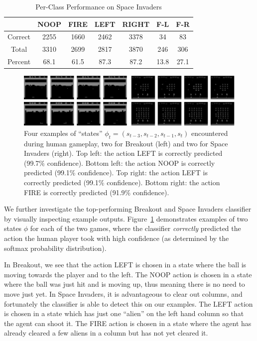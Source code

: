 \documentclass[letterpaper, 10pt, conference]{ieeeconf}
\begin{document}
\begin{table}[!t]
\renewcommand{\arraystretch}{1.3}
\caption{Per-Class Performance on Space Invaders}
\label{tab:spaceinv_perclass}
\centering
\begin{tabular}{c c c c c c c}
\hline
        & NOOP & FIRE & LEFT & RIGHT & F-L  & F-R  \\
\hline
Correct & 2255 & 1660 & 2462 & 3378  &  34  &   83 \\
Total   & 3310 & 2699 & 2817 & 3870  &  246 &  306 \\
Percent & 68.1 & 61.5 & 87.3 & 87.2  & 13.8 & 27.1 \\
\hline
\end{tabular}
\end{table}


\begin{figure}[t]
\centering
\includegraphics[width=1.00\textwidth]{figures/game_frame_examples.png}
\caption{\footnotesize
Four examples of ``states'' $\phi_t = (s_{t-3},s_{t-2},s_{t-1},s_t)$ encountered
during human gameplay, two for Breakout (left) and two for Space Invaders
(right). Top left: the action LEFT is correctly predicted (99.7\% confidence).
Bottom left: the action NOOP is correctly predicted (99.1\% confidence). Top
right: the action LEFT is correctly predicted (99.1\% confidence). Bottom right:
the action FIRE is correctly predicted (91.9\% confidence).
}
\label{fig:example_game_frames}
\end{figure}

We further investigate the top-performing Breakout and Space Invaders classifier
by visually inspecting example outputs. Figure~\ref{fig:example_game_frames}
demonstrates examples of two states $\phi$ for each of the two games, where the
classifier \emph{correctly} predicted the action the human player took with high
confidence (as determined by the softmax probability distribution).

In Breakout, we see that the action LEFT is chosen in a state where the ball is
moving towards the player and to the left. The NOOP action is chosen in a state
where the ball was just hit and is moving up, thus meaning there is no need to
move just yet. In Space Invaders, it is advantageous to clear out columns, and
fortunately the classifier is able to detect this on our examples.  The LEFT
action is chosen in a state which has just one ``alien'' on the left hand column
so that the agent can shoot it. The FIRE action is chosen in a state where the
agent has already cleared a few aliens in a column but has not yet cleared it.
\end{document}
